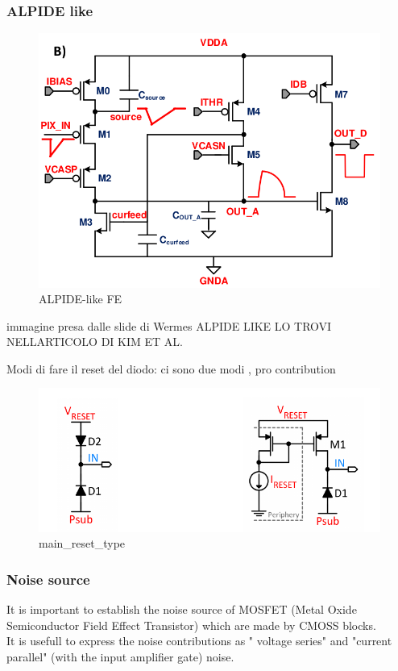 \begin{titlepage}
\subsubsection{ALPIDE like }
\begin{figure}
   \centering\includegraphics[width=15cm]{figures/ALPIDE_FE.png}
   \caption{ALPIDE-like FE}
   \label{fig:ALPIDE-like}
   \end{figure}
immagine presa dalle slide di Wermes
   ALPIDE LIKE LO TROVI NELLARTICOLO DI KIM ET AL.

Modi di fare il reset del diodo: ci sono due modi , pro contribution
\begin{figure}
   \centering\includegraphics[width=15cm]{figures/main_reset_type.png}
   \caption{main_reset_type}
   \label{fig:main_reset_type}
   \end{figure}   


\subsubsection{Noise source}
It is important to establish the noise source of MOSFET (Metal Oxide Semiconductor Field
Effect Transistor) which are made by CMOSS blocks.\\
It is usefull to express the noise contributions as " voltage series" and "current parallel"
(with the input amplifier gate) noise.\\



\end{titlepage}
